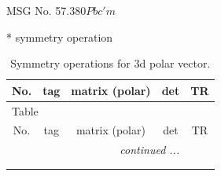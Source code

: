 \documentclass[fleqn,8pt]{jsarticle}
\begin{document}
\setcounter{MaxMatrixCols}{32}

\renewcommand{\tablename}{Table~}
\renewcommand{\figurename}{Figure~}
\begin{center}
\LARGE
MSG No. 57.380\quad$Pbc'm$
\end{center}
* symmetry operation
\renewcommand{\arraystretch}{1.3}
\begin{longtable}{ccccc}
\caption{Symmetry operations for 3d polar vector.}
 \\
 \hline \hline
No. & tag & matrix (polar) & det & TR \\ \hline \endfirsthead

\multicolumn{4}{l}{\tablename\ \thetable{}} \\
 \hline \hline
No. & tag & matrix (polar) & det & TR \\ \hline \endhead

 \hline \hline
\multicolumn{4}{r}{\footnotesize\it continued ...} \\ \endfoot

 \hline \hline
\multicolumn{4}{r}{} \\ \endlastfoot


\end{longtable}
\end{document}
